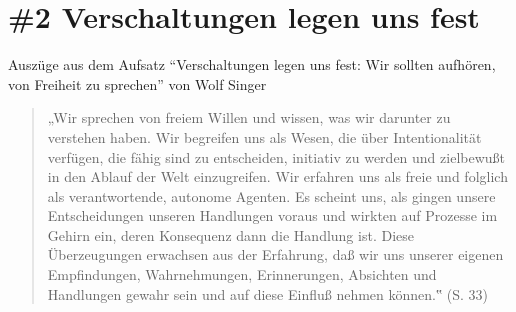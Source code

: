 \documentclass[
  a4paper,
]{report}
\begin{document}
\hypertarget{pr-ev2}{%
\section{\#2 Verschaltungen legen uns fest}\label{pr-ev2}}

Auszüge aus dem Aufsatz ``Verschaltungen legen uns fest: Wir sollten aufhören, von Freiheit zu sprechen'' von Wolf Singer \citeyearpar{Singer2004}

\begin{quote}
„Wir sprechen von freiem Willen und wissen, was wir darunter zu verstehen haben. Wir begreifen uns als Wesen, die über Intentionalität verfügen, die fähig sind zu entscheiden, initiativ zu werden und zielbewußt in den Ablauf der Welt einzugreifen. Wir erfahren uns als freie und folglich als verantwortende, autonome Agenten. Es scheint uns, als gingen unsere Entscheidungen unseren Handlungen voraus und wirkten auf Prozesse im Gehirn ein, deren Konsequenz dann die Handlung ist. Diese Überzeugungen erwachsen aus der Erfahrung, daß wir uns unserer eigenen Empfindungen, Wahrnehmungen, Erinnerungen, Absichten und Handlungen gewahr sein und auf diese Einfluß nehmen können.‟ (S. 33)
\end{quote}
\end{document}
